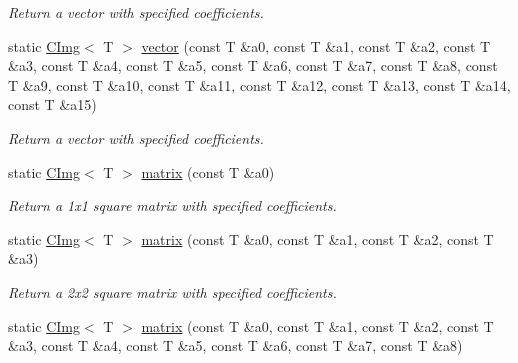 \begin{DoxyCompactItemize}
\begin{DoxyCompactList}\small\item\em Return a vector with specified coefficients. \item\end{DoxyCompactList}\item 
\hypertarget{structcimg__library_1_1CImg_a1be60115c2094fa8231b92025dfbf9a0}{
static \hyperlink{structcimg__library_1_1CImg}{CImg}$<$ T $>$ \hyperlink{structcimg__library_1_1CImg_a1be60115c2094fa8231b92025dfbf9a0}{vector} (const T \&a0, const T \&a1, const T \&a2, const T \&a3, const T \&a4, const T \&a5, const T \&a6, const T \&a7, const T \&a8, const T \&a9, const T \&a10, const T \&a11, const T \&a12, const T \&a13, const T \&a14, const T \&a15)}
\label{structcimg__library_1_1CImg_a1be60115c2094fa8231b92025dfbf9a0}

\begin{DoxyCompactList}\small\item\em Return a vector with specified coefficients. \item\end{DoxyCompactList}\item 
\hypertarget{structcimg__library_1_1CImg_adfba8474c6ed7cb810b22a88ca8a9806}{
static \hyperlink{structcimg__library_1_1CImg}{CImg}$<$ T $>$ \hyperlink{structcimg__library_1_1CImg_adfba8474c6ed7cb810b22a88ca8a9806}{matrix} (const T \&a0)}
\label{structcimg__library_1_1CImg_adfba8474c6ed7cb810b22a88ca8a9806}

\begin{DoxyCompactList}\small\item\em Return a 1x1 square matrix with specified coefficients. \item\end{DoxyCompactList}\item 
\hypertarget{structcimg__library_1_1CImg_a4dce73b905d98f22a5860464e571120f}{
static \hyperlink{structcimg__library_1_1CImg}{CImg}$<$ T $>$ \hyperlink{structcimg__library_1_1CImg_a4dce73b905d98f22a5860464e571120f}{matrix} (const T \&a0, const T \&a1, const T \&a2, const T \&a3)}
\label{structcimg__library_1_1CImg_a4dce73b905d98f22a5860464e571120f}

\begin{DoxyCompactList}\small\item\em Return a 2x2 square matrix with specified coefficients. \item\end{DoxyCompactList}\item 
\hypertarget{structcimg__library_1_1CImg_a80ec581a136a796347cfe19e4dea09e6}{
static \hyperlink{structcimg__library_1_1CImg}{CImg}$<$ T $>$ \hyperlink{structcimg__library_1_1CImg_a80ec581a136a796347cfe19e4dea09e6}{matrix} (const T \&a0, const T \&a1, const T \&a2, const T \&a3, const T \&a4, const T \&a5, const T \&a6, const T \&a7, const T \&a8)}
\label{structcimg__library_1_1CImg_a80ec581a136a796347cfe19e4dea09e6}


\end{DoxyCompactItemize}

